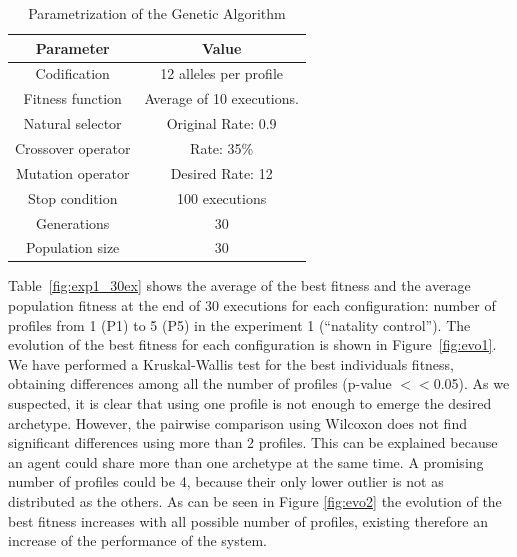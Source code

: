 \documentclass[letterpaper]{article}
\begin{document}
\begin{table}
\begin{center}
\caption{Parametrization of the Genetic Algorithm}
\label{fig:ga_parameters}
\begin{tabular}{cc}%
\hline\noalign{\smallskip}
\noalign{\smallskip}
Parameter & Value \\
\hline
\noalign{\smallskip}
Codification & 12 alleles per profile\\
Fitness function & Average of 10 executions.\\
Natural selector & Original Rate: 0.9 \\
Crossover operator & Rate: 35\% \\
Mutation operator & Desired Rate: 12 \\
Stop condition & 100 executions\\
Generations & 30\\
Population size & 30 \\
\hline
\end{tabular}


\end{center}
\end{table}






Table~\ref{fig:exp1_30ex} shows the average of the best fitness and the average population fitness at the end of 30 executions for each configuration: number of profiles from 1 (P1) to 5 (P5) in the experiment 1 (``natality control'').
The evolution of the best fitness for each configuration is shown in Figure~\ref{fig:evo1}. We have performed a Kruskal-Wallis test for the best individuals fitness, obtaining differences among all the number of profiles (p-value $<<$0.05). As we suspected, it is clear that using one profile is not enough to emerge the desired archetype. However, the pairwise comparison using Wilcoxon does not find significant differences using more than 2 profiles. This can be explained because an agent could share more than one archetype at the same time.  A promising number of profiles could be 4, because their only lower outlier is not as distributed as the others. As can be seen in Figure \ref{fig:evo2} the evolution of the best fitness increases with all possible number of profiles, existing therefore an increase of the performance of the system.
\end{document}
